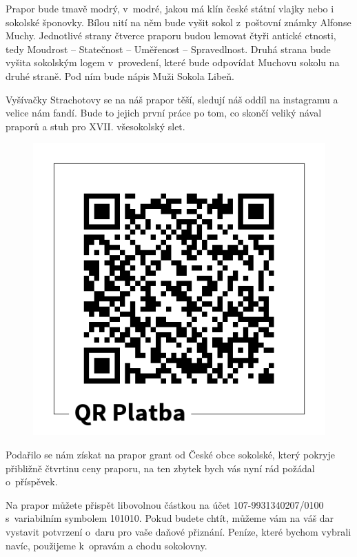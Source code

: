\documentclass[11pt]{article}
\begin{document}
Prapor bude tmavě modrý, v~modré, jakou má klín české státní vlajky nebo i sokolské šponovky. Bílou nití na něm bude vyšit sokol z~poštovní známky Alfonse Muchy. Jednotlivé strany čtverce praporu budou lemovat čtyři antické ctnosti, tedy Moudrost – Statečnost – Uměřenost – Spravedlnost. Druhá strana bude vyšita sokolským logem v~provedení, které bude odpovídat Muchovu sokolu na druhé straně. Pod ním bude nápis Muži Sokola Libeň.

Vyšívačky Strachotovy se na náš prapor těší, sledují náš oddíl na instagramu a velice nám fandí. Bude to jejich první práce po tom, co skončí veliký nával praporů a stuh pro XVII. všesokolský slet.

\begin{figure}
  \vspace*{-\baselineskip}
  \includegraphics[width=\linewidth]{./QR-prapor-muzi.png}
\end{figure}

Podařilo se nám získat na prapor grant od České obce sokolské, který pokryje přibližně čtvrtinu ceny praporu, na ten zbytek bych vás nyní rád požádal o~příspěvek.

Na prapor můžete přispět libovolnou částkou na účet 107-9931340207/0100 s~variabilním symbolem 101010. Pokud budete chtít, můžeme vám na váš dar vystavit potvrzení o~daru pro vaše daňové přiznání. Peníze, které bychom vybrali navíc, použijeme k~opravám a chodu sokolovny.
\end{document}
